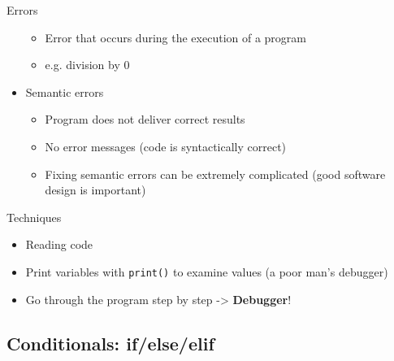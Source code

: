 \documentclass[10pt, a4paper]{beamer} %
\begin{document}
\begin{frame}[c,allowframebreaks]
\begin{block}{Errors}
\begin{itemize}
    \begin{itemize}
        \item Error that occurs during the execution of a program
        \item e.g. division by 0
    \end{itemize}
        \item Semantic errors
        \begin{itemize}
            \item Program does not deliver correct results
            \item No error messages (code is syntactically correct)
            \item Fixing semantic errors can be extremely complicated (good software design is important)
        \end{itemize}
    \end{itemize}
\end{block}
\framebreak
\begin{block}{Techniques}
\begin{itemize}
        \item Reading code
        \item Print variables with \lstinline!print()! to examine values (a poor man's debugger)
        \item Go through the program step by step -> \textbf{Debugger}!
    \end{itemize}    
\end{block}
    


\end{frame}

\subsection{Conditionals: if/else/elif} %
\label{sub:conditionals}
\end{document}
